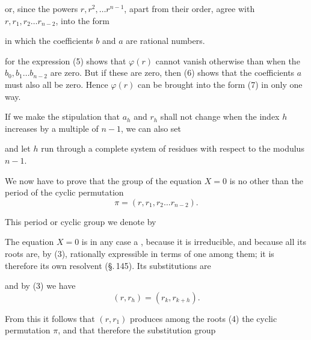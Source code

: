 

or, since the powers $r, r^2, \ldots r^{n-1}$, apart from their order, agree with $r, r_1, r_2 \ldots r_{n-2}$, into the form


in which the coefficients $b$ and $a$ are rational numbers.


for the expression (5) shows that $\varphi(r)$ cannot vanish otherwise than when the $b_0, b_1 \ldots b_{n-2}$ are zero. But if these are zero, then (6) shows that the coefficients $a$ must also all be zero. Hence $\varphi(r)$ can be brought into the form (7) in only one way.

If we make the stipulation that $a_h$ and $r_h$ shall not change when the index $h$ increases by a multiple of $n - 1$, we can also set


and let $h$ run through a complete system of residues with respect to the modulus $n - 1$.

We now have to prove that the group of the equation $X = 0$ is no other than the period of the cyclic permutation
\[
\pi = (r, r_1, r_2 \ldots r_{n-2}).
\]

This period or cyclic group we denote by


The equation $X = 0$ is in any case a , because it is irreducible, and because all its roots are, by (3), rationally expressible in terms of one among them; it is therefore its own  resolvent (\S.\,145). Its substitutions are


and by (3) we have
\[
(r, r_h) = (r_k, r_{k+h}).
\]

From this it follows that $(r, r_1)$ produces among the roots (4) the cyclic permutation $\pi$, and that therefore the substitution group
